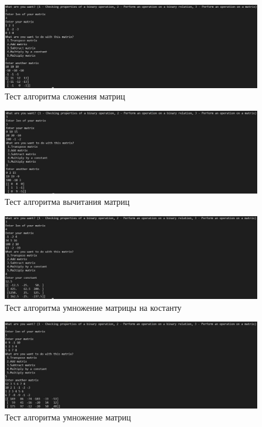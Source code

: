 \documentclass[spec, och, labwork]{shiza}
\begin{document}
\begin{figure}[H]
    \centering      %
    \includegraphics[width=1.\textwidth]{8}
    \caption{Тест алгоритма сложения матриц}
    \label{fig:image1}
\end{figure}

\begin{figure}[H]
    \centering      %
    \includegraphics[width=1.\textwidth]{9}
    \caption{Тест алгоритма вычитания матриц}
    \label{fig:image1}
\end{figure}

\begin{figure}[H]
    \centering      %
    \includegraphics[width=1.\textwidth]{10}
    \caption{Тест алгоритма умножение матрицы на костанту}
    \label{fig:image1}
\end{figure}

\begin{figure}[H]
    \centering      %
    \includegraphics[width=1.\textwidth]{11}
    \caption{Тест алгоритма умножение матриц}
    \label{fig:image1}
\end{figure}
\end{document}
